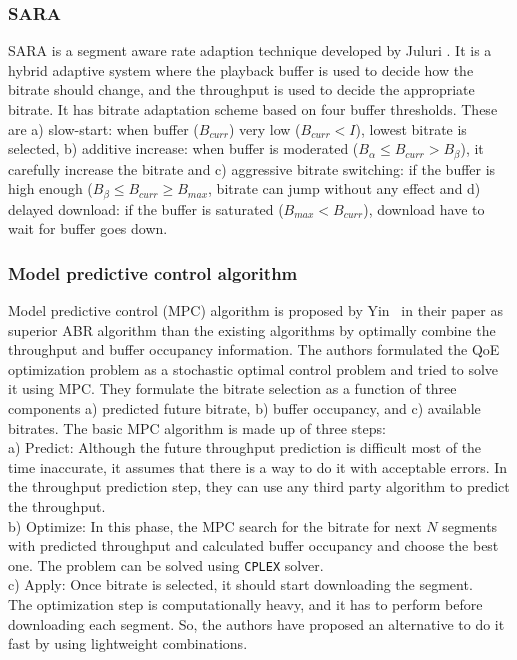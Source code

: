 \subsubsection{SARA}
SARA\cite{7247436} is a segment aware rate adaption technique developed by Juluri \etal. It is a hybrid adaptive system where the playback buffer is used to decide how the bitrate should change, and the throughput is used to decide the appropriate bitrate. It has bitrate adaptation scheme based on four buffer thresholds. These are a) slow-start: when buffer ($B_{curr}$) very low ($B_{curr}<I$), lowest bitrate is selected, b) additive increase: when buffer is moderated ($B_{\alpha} \le B_{curr} > B_{\beta}$), it carefully increase the bitrate and c) aggressive bitrate switching: if the buffer is high enough ($B_{\beta} \le B_{curr} \ge B_{max}$, bitrate can jump without any effect and d) delayed download: if the buffer is saturated ($B_{max} < B_{curr}$), download have to wait for buffer goes down.

\subsubsection{Model predictive control algorithm}
Model predictive control (MPC) algorithm is proposed by Yin \etal\ in their paper \cite{10.1145/2785956.2787486,10.1145/2670518.2673877} as superior ABR algorithm than the existing algorithms by optimally combine the throughput and buffer occupancy information. The authors formulated the QoE optimization problem as a stochastic optimal control problem and tried to solve it using MPC. They formulate the bitrate selection as a function of three components a) predicted future bitrate, b) buffer occupancy, and c) available bitrates. The basic MPC algorithm is made up of three steps: \\
a) Predict: Although the future throughput prediction is difficult most of the time inaccurate, it assumes that there is a way to do it with acceptable errors. In the throughput prediction step, they can use any third party algorithm to predict the throughput.\\
b) Optimize: In this phase, the MPC search for the bitrate for next $N$ segments with predicted throughput and calculated buffer occupancy and choose the best one. The problem can be solved using {\tt CPLEX} solver.\\
c) Apply: Once bitrate is selected, it should start downloading the segment.\\
The optimization step is computationally heavy, and it has to perform before downloading each segment. So, the authors have proposed an alternative to do it fast by using lightweight combinations.



